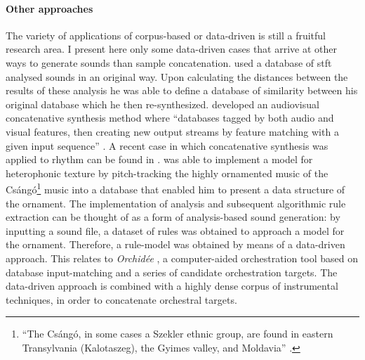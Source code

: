 \paragraph{Other approaches}
The variety of applications of corpus-based or data-driven is still a fruitful research area. I present here only some data-driven cases that arrive at other ways to generate sounds than sample concatenation. \textcite{icmc/bbp2372.2003.052} used a database of \gls{stft} analysed sounds in an original way. Upon calculating the distances between the results of these analysis he was able to define a database of similarity between his original database which he then re-synthesized. \textcite{DBLP:conf/icmc/Collins07} developed an audiovisual concatenative synthesis method where ``databases tagged by both audio and visual features, then creating new output streams by feature matching with a given input sequence'' \parencite[1]{DBLP:conf/icmc/Collins07}. A recent case in which concatenative synthesis was applied to rhythm can be found in \textcite{Nuannicode225in2016}. \textcite{icmc/bbp2372.2003.030} was able to implement a model for heterophonic texture by pitch-tracking the highly ornamented music of the Csángó\footnote{``The Csángó, in some cases a Szekler ethnic group, are found in eastern Transylvania (Kalotaszeg), the Gyimes valley, and Moldavia'' \parencite{icmc/bbp2372.2003.030}.} music into a database that enabled him to present a data structure of the ornament. The implementation of analysis and subsequent algorithmic rule extraction can be thought of as a form of analysis-based sound generation: by inputting a sound file, a dataset of rules was obtained to approach a model for the ornament. Therefore, a rule-model was obtained by means of a data-driven approach.	This relates to \textit{Orchidée} \parencite{gregoire_carpentier_2006_849343}, a computer-aided orchestration tool based on database input-matching and a series of candidate orchestration targets. The data-driven approach is combined with a highly dense corpus of instrumental techniques, in order to concatenate orchestral targets.

